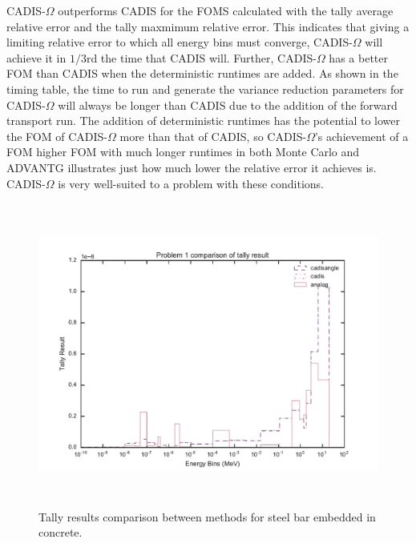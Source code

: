 CADIS-$\Omega$ outperforms CADIS for
the FOMS calculated with the tally average relative error and the tally maxmimum
relative error. This indicates that giving a limiting relative error to which
all energy bins must converge, CADIS-$\Omega$ will achieve it in $1/3$rd the time
that CADIS will. Further, CADIS-$\Omega$ has a better FOM than CADIS when the
deterministic runtimes are added. As shown in the timing table, the time to run
and generate the variance reduction parameters for CADIS-$\Omega$ will always be
longer than CADIS due to the addition of the forward transport run. The addition of
deterministic runtimes has the potential to lower the FOM of CADIS-$\Omega$ more than
that of CADIS, so CADIS-$\Omega$'s achievement of a FOM higher FOM with much
longer runtimes in both Monte Carlo and ADVANTG illustrates just how much lower
the relative error it achieves is. CADIS-$\Omega$ is very well-suited to a
problem with these conditions.

\begin{figure}[h!]
  \centering
  \includegraphics[height=10cm]{./chapters/characterization_probs/figures/char/prob_1/problem_1_tally_result_compare.pdf}
  \caption[Tally results comparison between methods for steel bar embedded in
  concrete.]
  {Tally results comparison between methods for steel bar embedded in concrete.}
  \label{fig:steelbeamresult}
\end{figure}

